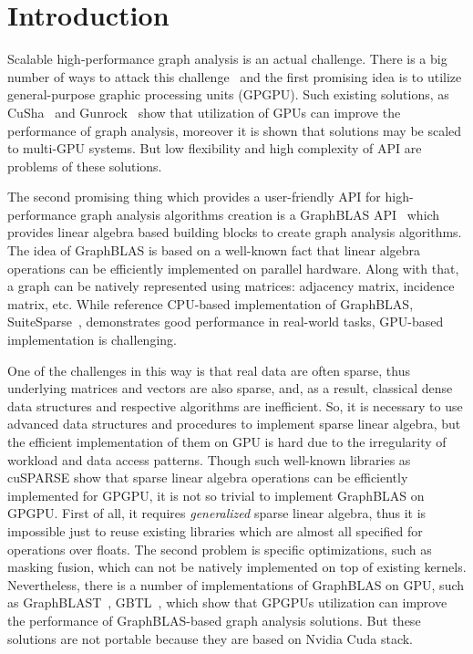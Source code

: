 \section{Introduction}

Scalable high-performance graph analysis is an actual challenge.
There is a big number of ways to attack this challenge~\cite{Coimbra2021} and the first promising idea is to utilize general-purpose graphic processing units (GPGPU).
Such existing solutions, as CuSha~\cite{10.1145/2600212.2600227} and Gunrock~\cite{7967137} show that utilization of GPUs can improve the performance of graph analysis, moreover it is shown that solutions may be scaled to multi-GPU systems.
But low flexibility and high complexity of API are problems of these solutions.

The second promising thing which provides a user-friendly API for high-performance graph analysis algorithms creation is a GraphBLAS API~\cite{7761646} which provides linear algebra based building blocks to create graph analysis algorithms.
The idea of GraphBLAS is based on a well-known fact that linear algebra operations can be efficiently implemented on parallel hardware.
Along with that, a graph can be natively represented using matrices: adjacency matrix, incidence matrix, etc.
While reference CPU-based implementation of GraphBLAS, SuiteSparse~\cite{10.1145/3322125}, demonstrates good performance in real-world tasks, GPU-based implementation is challenging.

One of the challenges in this way is that real data are often sparse, thus underlying matrices and vectors are also sparse, and, as a result, classical dense data structures and respective algorithms are inefficient. 
So, it is necessary to use advanced data structures and procedures to implement sparse linear algebra, but the efficient implementation of them on GPU is hard due to the irregularity of workload and data access patterns.
Though such well-known libraries as cuSPARSE show that sparse linear algebra operations can be efficiently implemented for GPGPU, it is not so trivial to implement GraphBLAS on GPGPU. 
First of all, it requires \textit{generalized} sparse linear algebra, thus it is impossible just to reuse existing libraries which are almost all specified for operations over floats.
The second problem is specific optimizations, such as masking fusion, which can not be natively implemented on top of existing kernels.
Nevertheless, there is a number of implementations of GraphBLAS on GPU, such as GraphBLAST~\cite{yang2019graphblast}, GBTL~\cite{7529957}, which show that GPGPUs utilization can improve the performance of GraphBLAS-based graph analysis solutions.
But these solutions are not portable because they are based on Nvidia Cuda stack.

